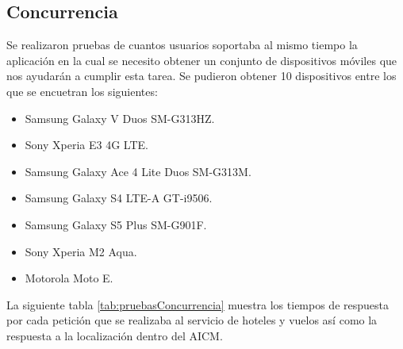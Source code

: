\subsection{Concurrencia}
Se realizaron pruebas de cuantos usuarios soportaba al mismo tiempo la aplicación en la cual se necesito obtener un conjunto de 
dispositivos móviles que nos ayudarán a cumplir esta tarea. Se pudieron obtener 10 dispositivos entre los que se encuetran los siguientes: 

\begin{itemize}
\item Samsung Galaxy V Duos SM-G313HZ.
\item Sony Xperia E3 4G LTE.
\item Samsung Galaxy Ace 4 Lite Duos SM-G313M.
\item Samsung Galaxy S4 LTE-A GT-i9506.
\item Samsung Galaxy S5 Plus SM-G901F.
\item Sony Xperia M2 Aqua.
\item Motorola Moto E.
\end{itemize}

La siguiente tabla \ref{tab:pruebasConcurrencia} muestra los tiempos de respuesta por cada petición que se realizaba al servicio de 
hoteles y vuelos así como la respuesta a la localización dentro del AICM.


